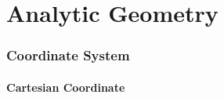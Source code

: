 \part{Analytic Geometry}\label{sec:analytic_geometry}

\section{Coordinate System}\label{sec:coordinate_system}

\subsection{Cartesian Coordinate}\label{sec:cartesian_coordinate}
